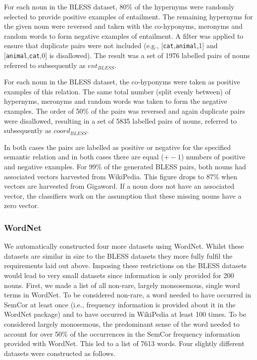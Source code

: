 \documentclass[11pt]{article}
\begin{document}
For each noun in the BLESS dataset, 80\% of the hypernyms were randomly selected to provide positive examples of entailment.  The remaining hypernyms for the given noun were reversed and taken with the co-hyponyms, meronyms and random words to form negative examples of entailment.  A filter was applied to ensure that duplicate pairs were not included (e.g., [\texttt{cat},\texttt{animal},1] and [\texttt{animal},\texttt{cat},0] is disallowed). The result was a set of 1976 labelled pairs of nouns referred to subsequently as $ent_{BLESS}$.

For each noun in the BLESS dataset, the co-hyponyms were taken as positive examples of this relation.  The same total number (split evenly between) of hypernyms, meronyms and random words was taken to form the negative examples.  The order of 50\% of the pairs was reversed and again duplicate pairs were disallowed, resulting in a set of 5835 labelled pairs of nouns, referred to subsequently as $coord_{BLESS}$.

In both cases the pairs are labelled as positive or negative for the specified semantic relation and in both cases there are equal ($+-1$) numbers of positive and negative examples.  For 99\% of the generated BLESS pairs, both nouns had associated vectors harvested from WikiPedia.   This figure drops to 87\% when vectors are harvested from Gigaword. If a noun does not have an associated vector, the classifiers work on the assumption that these missing nouns have a zero vector.  

\subsubsection{WordNet}

We automatically constructed four more datasets using WordNet.  Whilst these datasets are similar in size to the BLESS datasets they more fully fulfil the requirements laid out above.  Imposing these restrictions on the BLESS datasets would lead to very small datasets since information is only provided for 200 nouns.  First, we made a list of all non-rare, largely monsosemous, single word terms in WordNet.  To be considered non-rare, a word needed to have occurred in SemCor at least once (i.e., frequency information is provided about it in the WordNet package) and to have occurred in WikiPedia at least 100 times.  To be considered largely monosemous, the predominant sense of the word needed to account for over 50\% of the occurrences in the SemCor frequency information provided with WordNet.  This led to a list of 7613 words.  Four slightly different datasets were constructed as follows.
\end{document}
